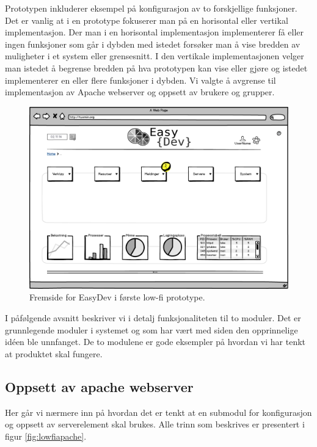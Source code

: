 Prototypen inkluderer eksempel på konfigurasjon av to forskjellige funksjoner.
Det er vanlig at i en prototype fokuserer man på en horisontal eller vertikal implementasjon. Der man i en horisontal implementasjon implementerer få eller ingen funksjoner som går i dybden med istedet forsøker man å vise bredden av muligheter i et system eller grensesnitt. I den vertikale implementasjonen velger man istedet å begrense bredden på hva prototypen kan vise eller gjøre og istedet implementerer en eller flere funksjoner i dybden.\cite{book:utforming}
Vi valgte å avgrense til implementasjon av Apache webserver og oppsett av brukere og grupper. 

\begin{figure}
\includegraphics[width=\textwidth,height=\textheight,keepaspectratio]{./img/prosessdokumentasjon/lowfi/fremside.png}
\caption[Low-fi prototype]{Fremside for EasyDev i første low-fi prototype.}
\label{fig:lowfi_fremside}
\end{figure}


I påfølgende avsnitt beskriver vi i detalj funksjonaliteten til to moduler. Det er grunnlegende moduler i systemet og som har vært med siden den opprinnelige idéen ble unnfanget. De to modulene er gode eksempler på hvordan vi har tenkt at produktet skal fungere.

\subsection{Oppsett av apache webserver}
Her går vi nærmere inn på hvordan det er tenkt at en submodul for konfigurasjon og oppsett av serverelement skal brukes. Alle trinn som beskrives er presentert i figur \ref{fig:lowfiapache}.

